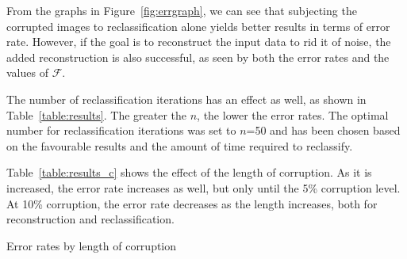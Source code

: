\documentclass{report}
\begin{document}
From the graphs in Figure~\ref{fig:errgraph}, we can see that subjecting the corrupted images to reclassification alone yields better results in terms of error rate. However, if the goal is to reconstruct the input data to rid it of noise, the added reconstruction is also successful, as seen by both the error rates and the values of $\mathcal{F}$. 

The number of reclassification iterations has an effect as well, as shown in Table~\ref{table:results}. The greater the $n$, the lower the error rates. The optimal number for reclassification iterations was set to $n$=50 and has been chosen based on the favourable results and the amount of time required to reclassify.

Table~\ref{table:results_c} shows the effect of the length of corruption. As it is increased, the error rate increases as well, but only until the 5\% corruption level. At 10\% corruption, the error rate decreases as the length increases, both for reconstruction and reclassification.



\begin{table}
	\begin{footnotesize}
	\end{footnotesize}
	\caption{Error rates by length of corruption}
	\label{table:results_c}
\end{table}
\end{document}
